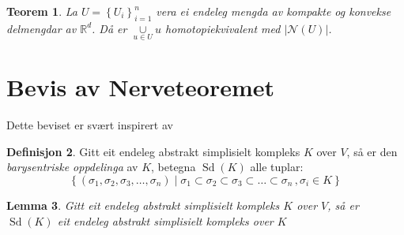 \documentclass[a4paper, 12pt, norsk]{article}
\theoremstyle{plain}
\newtheorem{theorem}{Teorem}[section]
\newtheorem{lemma}[theorem]{Lemma}
\theoremstyle{definition}
\newtheorem{definition}[theorem]{Definisjon}
\newcommand{\Rb}{\mathbb{R}}
\newcommand{\Nc}{\mathcal{N}}
\newcommand{\intersect}{ \mathop{\cap}\limits } %
\newcommand{\union}{ \mathop{\cup}\limits }
\newcommand{\gr}[1]{ \lvert #1 \rvert } %
\newcommand{\set}[1]{ \left \{ #1 \right \} } %
\DeclareMathOperator{\Sd}{Sd}
\begin{document}
%	

%
%

\begin{theorem} %
	La \( U = \set{U_i}_{i=1}^n \) vera ei endeleg mengda av kompakte og konvekse delmengdar av \( \Rb^d \). Då er \( \union_{u \in U} u \) homotopiekvivalent med \( \gr{\Nc(U)} \).
\end{theorem}

\section{Bevis av Nerveteoremet}

Dette beviset er svært inspirert av \cite{https://doi.org/10.48550/arxiv.2203.03571}

\begin{definition}
	Gitt eit endeleg abstrakt simplisielt kompleks \( K \) over \( V \), så er den \emph{barysentriske oppdelinga} av \( K \), betegna \( \Sd(K) \) alle tuplar: 
	\[
		\set{(\sigma_1, \sigma_2, \sigma_3, \dots, \sigma_n) \mid \sigma_1 \subset \sigma_2 \subset \sigma_3 \subset \dots \subset \sigma_n\,, \sigma_i \in K}
	\]
\end{definition}

\begin{lemma}
	Gitt eit endeleg abstrakt simplisielt kompleks \( K \) over \( V \), så er \( \Sd(K) \) eit endeleg abstrakt simplisielt kompleks over \( K \)
\end{lemma}
\end{document}
